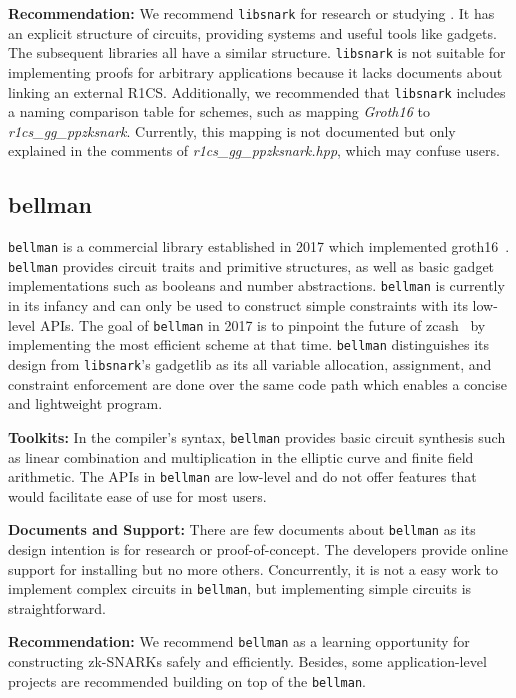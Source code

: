 \documentclass[letterpaper,twocolumn,10pt]{article}
\theoremstyle{definition}
\newcommand{\mypara}[1]{\noindent\textbf{{#1: }}}
\newcommand{\zk}{\text{zk-SNARK}\xspace}
\newcommand{\new}[1]{{#1}\xspace}
\newcommand{\lib}[1]{\texttt{#1}\xspace}
\begin{document}
\mypara{Recommendation} We recommend \lib{libsnark} for research or studying \zk. It has an explicit structure of circuits, providing systems and useful tools like gadgets. The subsequent libraries all have a similar structure. \lib{libsnark} is not suitable for implementing proofs for arbitrary applications because it lacks documents about linking an external R1CS. Additionally, we recommended that \lib{libsnark} includes a naming comparison table for \zk schemes, such as mapping \textit{Groth16} to \textit{r1cs\_gg\_ppzksnark}. Currently, this mapping is not documented but only explained in the comments of \textit{r1cs\_gg\_ppzksnark.hpp}, which may confuse users.

\subsection{bellman}
\lib{bellman} \cite{bellman} is a commercial library established in 2017 which implemented groth16~\cite{groth2016size}. \lib{bellman} provides circuit traits and primitive structures, as well as basic gadget implementations such as booleans and number abstractions. \lib{bellman} is currently in its infancy and can only be used to construct simple constraints with its low-level APIs. The goal of \lib{bellman} in 2017 is to pinpoint the future of zcash~\cite{sasson2014zerocash} by implementing the most efficient \zk scheme at that time. \lib{bellman} distinguishes its design from \lib{libsnark}'s gadgetlib as its all variable allocation, assignment, and constraint enforcement are done over the same code path which enables a concise and lightweight program. 

\mypara{Toolkits} 
\new{In the compiler's syntax}, \lib{bellman} provides basic circuit synthesis such as linear combination and multiplication in the elliptic curve and finite field arithmetic. The APIs in \lib{bellman} are low-level and do not offer features that would facilitate ease of use for most users.

\mypara{Documents and Support}
There are few documents about \lib{bellman} as its design intention is for research or proof-of-concept. The developers provide online support for installing but no more others. Concurrently, it is not a easy work to implement complex circuits in \lib{bellman}, but implementing simple circuits is straightforward. 

\mypara{Recommendation}
We recommend \lib{bellman} as a learning opportunity for constructing zk-SNARKs safely and efficiently. Besides, some application-level projects are recommended building on top of the \lib{bellman}.
\end{document}
